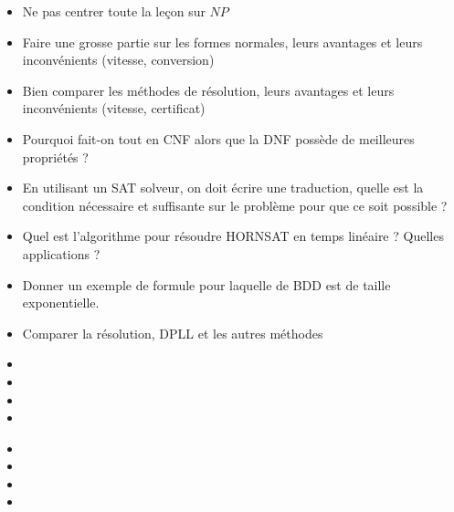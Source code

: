 \documentclass{agregfiche}
\begin{document}
\secpieges

\begin{itemize}
    \item Ne pas centrer toute la leçon sur $NP$
    \item Faire une grosse partie sur les formes normales, leurs avantages
        et leurs inconvénients (vitesse, conversion)
    \item Bien comparer les méthodes de résolution, leurs avantages et leurs
        inconvénients (vitesse, certificat)
\end{itemize}


\secquestionsclassiques

\begin{itemize}
    \item Pourquoi fait-on tout en CNF alors que la DNF possède de meilleures 
        propriétés ?
    \item En utilisant un SAT solveur, on doit écrire une traduction, quelle
        est la condition nécessaire et suffisante sur le problème pour que ce soit
        possible ?
    \item Quel est l'algorithme pour résoudre HORNSAT en temps linéaire ?
        Quelles applications ?
    \item Donner un exemple de formule pour laquelle de BDD est de taille
        exponentielle.
    \item Comparer la résolution, DPLL et les autres méthodes
\end{itemize}

\secreferences

\begin{itemize}
    \item {}
    \item {}
    \item {}
    \item {} 
\end{itemize}

\secdev

\begin{itemize}
    \item {}
    \item {}
    \item {}
    \item {}
\end{itemize}
\end{document}
